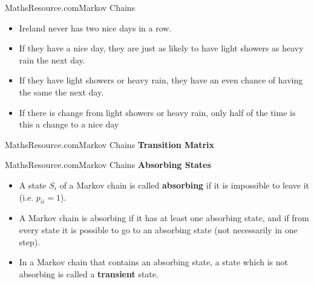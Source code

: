 \begin{frame}{MathsResource.com}{Markov Chains}
\Large
\begin{itemize}
\item Ireland never has two nice days in a row. 

\item If they have a nice day, they are just as likely to have light showers as heavy rain the
next day. 

\item If they have light showers or heavy rain, they have an even chance of having the same
the next day. 

\item If there is change from light showers or heavy rain, only half of the time is this a
change to a nice day
\end{itemize}
\end{frame}
\begin{frame}{MathsResource.com}{Markov Chains}
\Large
\textbf{Transition Matrix}
 


\end{frame}

\begin{frame}{MathsResource.com}{Markov Chains}
\Large
\textbf{Absorbing States}
\begin{itemize}
\item A state $S_i$ of a Markov chain is called \textbf{absorbing} if it is impossible
to leave it (i.e. $p_{ii} = 1$). 
\item A Markov chain is absorbing if it has at least one absorbing
state, and if from every state it is possible to go to an absorbing state (not necessarily
in one step).
\item In a Markov chain that contains an absorbing state, a state which is not absorbing is
called a \textbf{transient} state.
\end{itemize}
\end{frame}
